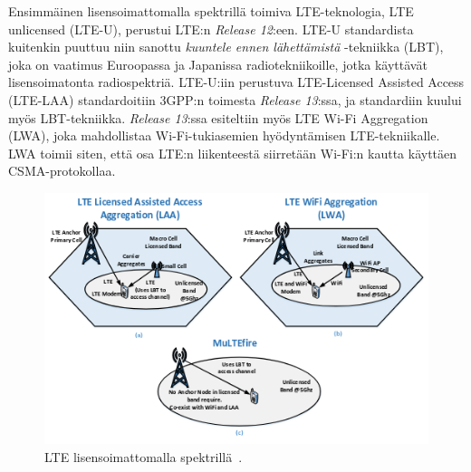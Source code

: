 \documentclass[finnish,12pt,a4paper,pdftex]{article}
\begin{document}
Ensimmäinen lisensoimattomalla spektrillä toimiva LTE-teknologia, LTE unlicensed (LTE-U), perustui LTE:n \textit{Release 12}:een. LTE-U standardista kuitenkin puuttuu niin sanottu \textit{kuuntele ennen lähettämistä} -tekniikka (LBT), joka on vaatimus Euroopassa ja Japanissa radiotekniikoille, jotka käyttävät lisensoimatonta radiospektriä. LTE-U:iin perustuva LTE-Licensed Assisted Access (LTE-LAA) standardoitiin 3GPP:n toimesta \textit{Release 13}:ssa, ja standardiin kuului myös LBT-tekniikka. \textit{Release 13}:ssa esiteltiin myös LTE Wi-Fi Aggregation (LWA), joka mahdollistaa Wi-Fi-tukiasemien hyödyntämisen LTE-tekniikalle. LWA toimii siten, että osa LTE:n liikenteestä siirretään Wi-Fi:n kautta käyttäen CSMA-protokollaa.~\cite{ismaiel2017survey}
~\begin{figure}[h!]
    \centering
    \includegraphics[scale=0.5]{Images/unlicensed.png}
    \caption{LTE lisensoimattomalla spektrillä~\cite{ismaiel2017survey}.}
    \label{fig:unlicensed}
\end{figure}
\end{document}
